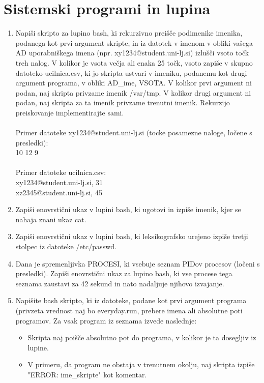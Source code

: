 \documentclass{book}
\begin{document}
\section{Sistemski programi in lupina}
\begin{enumerate}
    \item Napiši skripto za lupino bash, ki rekurzivno preišče podimenike imenika, podanega kot prvi argument skripte, in iz datotek v imenom v obliki vašega AD uporabniškega imena (npr. xy1234@student.uni-lj.si) izlušči vsoto točk treh nalog. V kolikor je vsota večja ali enaka 25 točk, vsoto zapiše v skupno datoteko ucilnica.csv, ki jo skripta ustvari v imeniku, podanemu kot drugi argument programa, v obliki AD\_ime, VSOTA. V kolikor prvi argument ni podan, naj skripta privzame imenik /var/tmp. V kolikor drugi argument ni podan, naj skripta za ta imenik privzame trenutni imenik. Rekurzijo preiskovanje implementirajte sami. \\ \\ Primer datoteke xy1234@student.uni-lj.si (tocke posamezne naloge, ločene s presledki): \\10 12 9 \\ \\ Primer datoteke ucilnica.csv: \\xy1234@student.uni-lj.si, 31 \\xz2345@student.uni-lj.si, 45 
    \item Zapiši enovrstični ukaz v lupini bash, ki ugotovi in izpiše imenik, kjer se nahaja znani ukaz cat.
    \item Zapiši enovrstični ukaz v lupini bash, ki leksikografsko urejeno izpiše tretji stolpec iz datoteke /etc/passwd.
    \item Dana je spremenljivka PROCESI, ki vsebuje seznam PIDov procesov (ločeni s presledki). Zapiši enovrstični ukaz za lupino bash, ki vse procese tega seznama zaustavi za 42 sekund in nato nadaljuje njihovo izvajanje.
    \item Napišite bash skripto, ki iz datoteke, podane kot prvi argument programa (privzeta vrednost naj bo everyday.run, prebere imena ali absolutne poti programov. Za vsak program iz seznama izvede naslednje:
        \begin{itemize}
            \item Skripta naj poišče absolutno pot do programa, v kolikor je ta dosegljiv iz lupine.
            \item V primeru, da program ne obstaja v trenutnem okolju, naj skripta izpiše "ERROR: ime\_skripte" kot komentar.

\end{itemize}
\end{enumerate}
\end{document}
